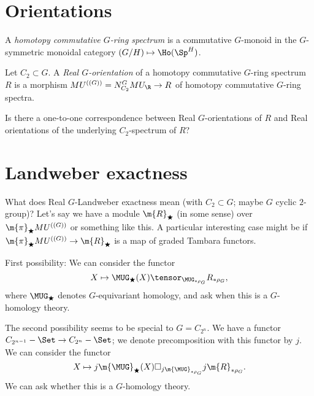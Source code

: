 \documentclass[11pt]{article}
\begin{document}
\section{Orientations}
\begin{defi}
A \emph{homotopy commutative $G$-ring spectrum} is a commutative $G$-monoid in the $G$-symmetric monoidal category $(G/H) \mapsto \Ho(\Sp^H)$. 
\end{defi}

\begin{defi}
Let $C_2 \subset G$. A \emph{Real $G$-orientation} of a homotopy commutative $G$-ring spectrum $R$ is a morphism $MU^{((G))} = N_{C_2}^G MU_{\R} \to R$ of homotopy commutative $G$-ring spectra. 
\end{defi}

\begin{question}
Is there a one-to-one correspondence between Real $G$-orientations of $R$ and Real orientations of the underlying $C_2$-spectrum of $R$?
\end{question}

\section{Landweber exactness}
What does Real $G$-Landweber exactness mean (with $C_2\subset G$; maybe $G$ cyclic $2$-group)? Let's say we have a module $\m{R}_{\bigstar}$ (in some sense) over $\m{\pi}_\bigstar MU^{((G))}$ or something like this. A particular interesting case might be if $\m{\pi}_\bigstar MU^{((G))} \to \m{R}_{\bigstar}$ is a map of graded Tambara functors. 

First possibility: We can consider the functor
$$X \mapsto \MUG_{\bigstar}(X) \tensor_{\MUG_{*\rho_G}} R_{*\rho_{G}},$$
where $\MUG_{\bigstar}$ denotes $G$-equivariant homology, and ask when this is a $G$-homology theory. 

The second possibility seems to be special to $G = C_{2^n}$. We have a functor $C_{2^{n-1}}-\Set \to C_{2^n}-\Set$; we denote precomposition with this functor by $j$. We can consider the functor
$$X \mapsto j\m{\MUG}_{\bigstar}(X)\Box_{j\m{\MUG}_{*\rho_G}} j\m{R}_{*\rho_G}.$$
We can ask whether this is a $G$-homology theory. 
\end{document}
